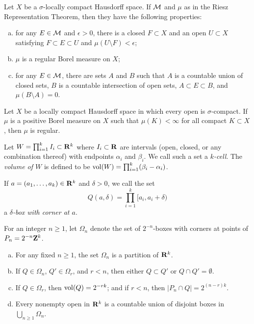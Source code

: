 \begin{theorem}
  Let $X$ be a $\sigma$-locally compact Hausdorff space. If $\mathcal{M}$ and $\mu$ as in the Riesz Representation Theorem, then they have the following properties:
  \begin{enumerate}[(a)]
  \item for any $E \in \mathcal{M}$ and $\epsilon > 0$, there is a closed $F \subset X$ and an open $U \subset X$ satisfying $F \subset E \subset U$ and $\mu(U \setminus F) < \epsilon$;
  \item $\mu$ is a regular Borel measure on $X$;
  \item for any $E \in \mathcal{M}$, there are sets $A$ and $B$ such that $A$ is a countable union of closed sets, $B$ is a countable intersection of open sets, $A \subset E \subset B$, and $\mu(B \setminus A) = 0$.
  \end{enumerate}
\end{theorem}

\begin{theorem}
  Let $X$ be a locally compact Hausdorff space in which every open is $\sigma$-compact. If $\mu$ is a positive Borel measure on $X$ such that $\mu(K) < \infty$ for all compact $K \subset X$, then $\mu$ is regular.
\end{theorem}

\begin{definition}
  Let $W = \prod_{i=1}^k I_i \subset \mathbf{R}^k$ where $I_i \subset \mathbf{R}$ are intervals (open, closed, or any combination thereof) with endpoints $\alpha_i$ and $\beta_i$. We call such a set a \emph{$k$-cell}. The \emph{volume of $W$} is defined to be $\operatorname{vol}(W) = \prod_{i=1}^k (\beta_i - \alpha_i)$.

  If $a = (a_1, \dots, a_k) \in \mathbf{R}^k$ and $\delta > 0$, we call the set
  \[
  Q(a, \delta) = \prod_{i=1}^k [a_i, a_i+\delta)
  \]
  a \emph{$\delta$-box with corner at $a$}.

  For an integer $n \geq 1$, let $\Omega_n$ denote the set of $2^{-n}$-boxes with corners at points of $P_n = 2^{-n} \mathbf{Z}^k$.
\end{definition}

\begin{proposition}
  \mbox{}
  \begin{enumerate}[(a)]
  \item For any fixed $n \geq 1$, the set $\Omega_n$ is a partition of $\mathbf{R}^k$.
  \item If $Q \in \Omega_n$, $Q' \in \Omega_r$, and $r < n$, then either $Q \subset Q'$ or $Q \cap Q' = \emptyset$.
  \item If $Q \in \Omega_r$, then $\operatorname{vol}(Q) = 2^{-r k}$; and if $r < n$, then $|P_n \cap Q| = 2^{(n-r)k}$.
  \item Every nonempty open in $\mathbf{R}^k$ is a countable union of disjoint boxes in $\bigcup_{n \geq 1} \Omega_n$.
  \end{enumerate}
\end{proposition}

